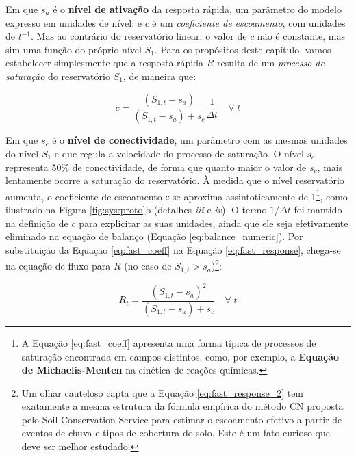 \documentclass[./main.tex]{subfiles}
\begin{document}
Em que $s_a$ é o \textbf{nível de ativação} da resposta rápida, um parâmetro do modelo expresso em unidades de nível; e  $c$ é um \textit{coeficiente de escoamento}, com unidades de $t^{-1}$. Mas ao contrário do reservatório linear, o valor de $c$ não é constante, mas sim uma função do próprio nível $S_1$. Para os propósitos deste capítulo, vamos estabelecer simplesmente que a resposta rápida $R$ resulta de um \textit{processo de saturação} do reservatório $S_1$, de maneira que:
\begin{linenomath*}
\begin{equation} 
	\label{eq:fast_coeff}
	c = \frac{(S_{1,t} - s_a)}{(S_{1,t} - s_a) + s_c} \frac{1}{\Delta t} \quad \forall\;t
\end{equation}
\end{linenomath*}
Em que $s_c$ é o \textbf{nível de conectividade}, um parâmetro com as mesmas unidades do nível $S_1$ e que regula a velocidade do processo de saturação. O nível $s_c$ representa 50\% de conectividade, de forma que quanto maior o valor de $s_c$, mais lentamente ocorre a saturação do reservatório. À medida que o nível reservatório aumenta, o coeficiente de escoamento $c$ se aproxima assintoticamente de 1\footnote{A Equação \eqref{eq:fast_coeff} apresenta uma forma típica de processos de saturação encontrada em campos distintos, como, por exemplo, a \textbf{Equação de Michaelis-Menten} na cinética de reações químicas.}, como ilustrado na Figura \ref{fig:sys:proto}b (detalhes \textrm{\textit{iii}} e \textrm{\textit{iv}}). O termo $1/ \Delta t$ foi mantido na definição de $c$ para explicitar as suas unidades, ainda que ele seja efetivamente eliminado na equação de balanço (Equação \eqref{eq:balance_numeric}). Por substituição da Equação \eqref{eq:fast_coeff} na Equação \eqref{eq:fast_response}, chega-se na equação de fluxo para $R$ (no caso de $S_{1,t} > s_a$)\footnote{Um olhar cauteloso capta que a Equação \eqref{eq:fast_response_2} tem exatamente a mesma estrutura da fórmula empírica do método CN proposta pelo Soil Conservation Service para estimar o escoamento efetivo a partir de eventos de chuva e tipos de cobertura do solo. Este é um fato curioso que deve ser melhor estudado.}:
\begin{linenomath*}
\begin{equation} 
\label{eq:fast_response_2}
 R_{t} = \frac{(S_{1,t} - s_a)^2}{(S_{1,t} - s_a) + s_c} \quad \forall\;t
\end{equation}
\end{linenomath*}
\end{document}
